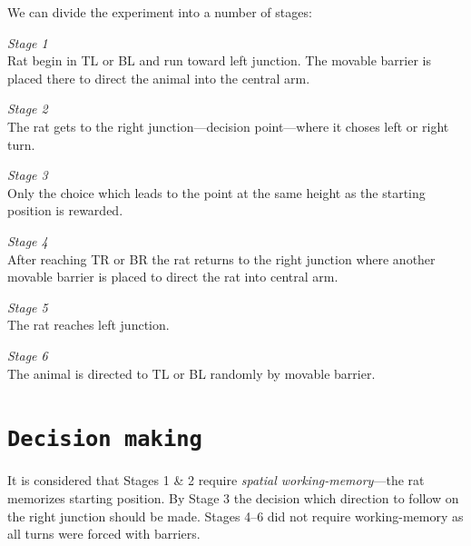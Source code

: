 \documentclass[11pt,a4paper,twocolumn]{article}
\begin{document}
We can divide the experiment into a number of stages:
\begin{description}
\item{\emph{Stage 1}} \hfill\\
Rat begin in TL or BL and run toward left junction. The movable barrier is placed there to direct the animal into the central arm.
\item{\emph{Stage 2}} \hfill\\
The rat gets to the right junction---decision point---where it choses left or right turn.
\item{\emph{Stage 3}} \hfill\\
Only the choice which leads to the point at the same height as the starting position is rewarded.
\item{\emph{Stage 4}} \hfill\\
After reaching TR or BR the rat returns to the right junction where another movable barrier is placed to direct the rat into central arm.
\item{\emph{Stage 5}} \hfill\\
The rat reaches left junction.
\item{\emph{Stage 6}} \hfill\\
The animal is directed to TL or BL randomly by movable barrier.
\end{description}


\section*{\texttt{Decision making}}
It is considered that Stages 1 \& 2 require \emph{spatial working-memory}---the rat memorizes starting position. By Stage 3 the decision which direction to follow on the right junction should be made. Stages 4--6 did not require working-memory as all turns were forced with barriers.\\
\end{document}
